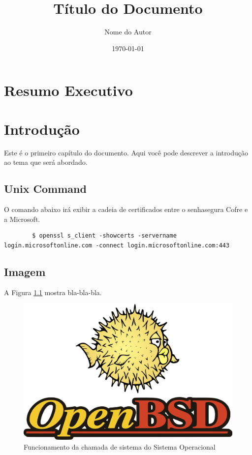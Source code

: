 \documentclass[a4paper,12pt]{report}
\title{Título do Documento}
\author{Nome do Autor}
\date{\today} %
\begin{document}
\maketitle
\newpage

\chapter*{Resumo Executivo}
\lipsum[1-2] %

\newpage

\tableofcontents

\newpage

\chapter{Introdução}
Este é o primeiro capítulo do documento. Aqui você pode descrever a introdução ao tema que será abordado.

\section{Unix Command}
O comando abaixo irá exibir a cadeia de certificados entre o senhasegura Cofre e a Microsoft.

\begin{tcolorbox}[width=\textwidth, enhanced, breakable]
	{\scriptsize
		\begin{verbatim}
		$ openssl s_client -showcerts -servername login.microsoftonline.com -connect login.microsoftonline.com:443
		\end{verbatim}
	}
\end{tcolorbox}

\section{Imagem}
A Figura \ref{fig:openbsd} mostra bla-bla-bla.\\

\begin{figure}[H]
	\centering
	\includegraphics[scale=0.10]{img/openbsd.png}
	\caption{Funcionamento da chamada de sistema do Sistema Operacional}
	\label{fig:openbsd}
\end{figure}
\end{document}
